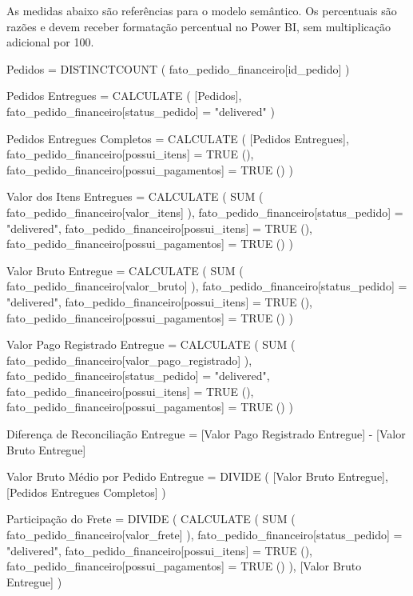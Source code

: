 \documentclass[12pt,a4paper]{article}
\newenvironment{Shaded}{}{}
\newcommand{\NormalTok}[1]{#1}
\begin{document}
As medidas abaixo são referências para o modelo semântico. Os
percentuais são razões e devem receber formatação percentual no Power
BI, sem multiplicação adicional por 100.

\begin{Shaded}
\begin{Highlighting}[]
\NormalTok{Pedidos =}
\NormalTok{DISTINCTCOUNT ( fato\_pedido\_financeiro[id\_pedido] )}

\NormalTok{Pedidos Entregues =}
\NormalTok{CALCULATE (}
\NormalTok{    [Pedidos],}
\NormalTok{    fato\_pedido\_financeiro[status\_pedido] = "delivered"}
\NormalTok{)}

\NormalTok{Pedidos Entregues Completos =}
\NormalTok{CALCULATE (}
\NormalTok{    [Pedidos Entregues],}
\NormalTok{    fato\_pedido\_financeiro[possui\_itens] = TRUE (),}
\NormalTok{    fato\_pedido\_financeiro[possui\_pagamentos] = TRUE ()}
\NormalTok{)}

\NormalTok{Valor dos Itens Entregues =}
\NormalTok{CALCULATE (}
\NormalTok{    SUM ( fato\_pedido\_financeiro[valor\_itens] ),}
\NormalTok{    fato\_pedido\_financeiro[status\_pedido] = "delivered",}
\NormalTok{    fato\_pedido\_financeiro[possui\_itens] = TRUE (),}
\NormalTok{    fato\_pedido\_financeiro[possui\_pagamentos] = TRUE ()}
\NormalTok{)}

\NormalTok{Valor Bruto Entregue =}
\NormalTok{CALCULATE (}
\NormalTok{    SUM ( fato\_pedido\_financeiro[valor\_bruto] ),}
\NormalTok{    fato\_pedido\_financeiro[status\_pedido] = "delivered",}
\NormalTok{    fato\_pedido\_financeiro[possui\_itens] = TRUE (),}
\NormalTok{    fato\_pedido\_financeiro[possui\_pagamentos] = TRUE ()}
\NormalTok{)}

\NormalTok{Valor Pago Registrado Entregue =}
\NormalTok{CALCULATE (}
\NormalTok{    SUM ( fato\_pedido\_financeiro[valor\_pago\_registrado] ),}
\NormalTok{    fato\_pedido\_financeiro[status\_pedido] = "delivered",}
\NormalTok{    fato\_pedido\_financeiro[possui\_itens] = TRUE (),}
\NormalTok{    fato\_pedido\_financeiro[possui\_pagamentos] = TRUE ()}
\NormalTok{)}

\NormalTok{Diferença de Reconciliação Entregue =}
\NormalTok{[Valor Pago Registrado Entregue] {-} [Valor Bruto Entregue]}

\NormalTok{Valor Bruto Médio por Pedido Entregue =}
\NormalTok{DIVIDE (}
\NormalTok{    [Valor Bruto Entregue],}
\NormalTok{    [Pedidos Entregues Completos]}
\NormalTok{)}

\NormalTok{Participação do Frete =}
\NormalTok{DIVIDE (}
\NormalTok{    CALCULATE (}
\NormalTok{        SUM ( fato\_pedido\_financeiro[valor\_frete] ),}
\NormalTok{        fato\_pedido\_financeiro[status\_pedido] = "delivered",}
\NormalTok{        fato\_pedido\_financeiro[possui\_itens] = TRUE (),}
\NormalTok{        fato\_pedido\_financeiro[possui\_pagamentos] = TRUE ()}
\NormalTok{    ),}
\NormalTok{    [Valor Bruto Entregue]}
\NormalTok{)}


\end{Highlighting}
\end{Shaded}
\end{document}
